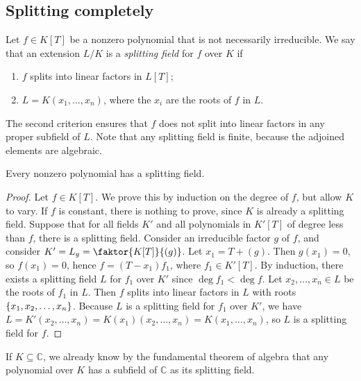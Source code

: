 \subsection{Splitting completely}
\begin{definition}
	Let \( f \in K[T] \) be a nonzero polynomial that is not necessarily irreducible.
	We say that an extension \( L / K \) is a \emph{splitting field} for \( f \) over \( K \) if
	\begin{enumerate}
		\item \( f \) splits into linear factors in \( L[T] \);
		\item \( L = K(x_1, \dots, x_n) \), where the \( x_i \) are the roots of \( f \) in \( L \).
	\end{enumerate}
\end{definition}
\begin{remark}
	The second criterion ensures that \( f \) does not split into linear factors in any proper subfield of \( L \).
	Note that any splitting field is finite, because the adjoined elements are algebraic.
\end{remark}
\begin{theorem}
	Every nonzero polynomial has a splitting field.
\end{theorem}
\begin{proof}
	Let \( f \in K[T] \).
	We prove this by induction on the degree of \( f \), but allow \( K \) to vary.
	If \( f \) is constant, there is nothing to prove, since \( K \) is already a splitting field.
	Suppose that for all fields \( K' \) and all polynomials in \( K'[T] \) of degree less than \( f \), there is a splitting field.
	Consider an irreducible factor \( g \) of \( f \), and consider \( K' = L_g = \faktor{K[T]}{(g)} \).
	Let \( x_1 = T + (g) \).
	Then \( g(x_1) = 0 \), so \( f(x_1) = 0 \), hence \( f = (T - x_1)f_1 \), where \( f_1 \in K'[T] \).
	By induction, there exists a splitting field \( L \) for \( f_1 \) over \( K' \) since \( \deg f_1 < \deg f \).
	Let \( x_2, \dots, x_n \in L \) be the roots of \( f_1 \) in \( L \).
	Then \( f \) splits into linear factors in \( L \) with roots \( \qty{x_1, x_2, \dots, x_n} \).
	Because \( L \) is a splitting field for \( f_1 \) over \( K' \), we have \( L = K'(x_2, \dots, x_n) = K(x_1)(x_2, \dots, x_n) = K(x_1, \dots, x_n) \), so \( L \) is a splitting field for \( f \).
\end{proof}
\begin{remark}
	If \( K \subseteq \mathbb C \), we already know by the fundamental theorem of algebra that any polynomial over \( K \) has a subfield of \( \mathbb C \) as its splitting field.
\end{remark}

